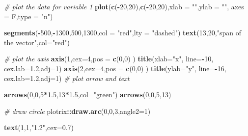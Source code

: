\documentclass[
]{book}
\newenvironment{Shaded}{\begin{snugshade}}{\end{snugshade}}
\newcommand{\CommentTok}[1]{\textcolor[rgb]{0.56,0.35,0.01}{\textit{#1}}}
\newcommand{\DataTypeTok}[1]{\textcolor[rgb]{0.13,0.29,0.53}{#1}}
\newcommand{\DecValTok}[1]{\textcolor[rgb]{0.00,0.00,0.81}{#1}}
\newcommand{\FloatTok}[1]{\textcolor[rgb]{0.00,0.00,0.81}{#1}}
\newcommand{\KeywordTok}[1]{\textcolor[rgb]{0.13,0.29,0.53}{\textbf{#1}}}
\newcommand{\NormalTok}[1]{#1}
\newcommand{\OperatorTok}[1]{\textcolor[rgb]{0.81,0.36,0.00}{\textbf{#1}}}
\newcommand{\StringTok}[1]{\textcolor[rgb]{0.31,0.60,0.02}{#1}}
\theoremstyle{definition}
\theoremstyle{definition}
\theoremstyle{definition}
\theoremstyle{remark}
\begin{document}
\begin{Shaded}
\begin{Highlighting}[]
\CommentTok{# plot the data for variable 1}
\KeywordTok{plot}\NormalTok{(}\KeywordTok{c}\NormalTok{(}\OperatorTok{-}\DecValTok{20}\NormalTok{,}\DecValTok{20}\NormalTok{),}\KeywordTok{c}\NormalTok{(}\OperatorTok{-}\DecValTok{20}\NormalTok{,}\DecValTok{20}\NormalTok{),}\DataTypeTok{xlab =} \StringTok{""}\NormalTok{,}\DataTypeTok{ylab =} \StringTok{""}\NormalTok{,}
 \DataTypeTok{axes =}\NormalTok{ F,}\DataTypeTok{type =} \StringTok{"n"}\NormalTok{)}

\KeywordTok{segments}\NormalTok{(}\OperatorTok{-}\DecValTok{500}\NormalTok{,}\OperatorTok{-}\DecValTok{1300}\NormalTok{,}\DecValTok{500}\NormalTok{,}\DecValTok{1300}\NormalTok{,}\DataTypeTok{col =} \StringTok{"red"}\NormalTok{,}\DataTypeTok{lty =} \StringTok{"dashed"}\NormalTok{)}
\KeywordTok{text}\NormalTok{(}\DecValTok{13}\NormalTok{,}\DecValTok{20}\NormalTok{,}\StringTok{"span of the vector"}\NormalTok{,}\DataTypeTok{col=}\StringTok{"red"}\NormalTok{)}

\CommentTok{# plot the axis}
\KeywordTok{axis}\NormalTok{(}\DecValTok{1}\NormalTok{,}\DataTypeTok{cex=}\DecValTok{4}\NormalTok{,}\DataTypeTok{pos =} \KeywordTok{c}\NormalTok{(}\DecValTok{0}\NormalTok{,}\DecValTok{0}\NormalTok{) )}
\KeywordTok{title}\NormalTok{(}\DataTypeTok{xlab=}\StringTok{"x"}\NormalTok{, }\DataTypeTok{line=}\OperatorTok{-}\DecValTok{10}\NormalTok{, }\DataTypeTok{cex.lab=}\FloatTok{1.2}\NormalTok{,}\DataTypeTok{adj=}\DecValTok{1}\NormalTok{)}
\KeywordTok{axis}\NormalTok{(}\DecValTok{2}\NormalTok{,}\DataTypeTok{cex=}\DecValTok{4}\NormalTok{,}\DataTypeTok{pos =} \KeywordTok{c}\NormalTok{(}\DecValTok{0}\NormalTok{,}\DecValTok{0}\NormalTok{) )}
\KeywordTok{title}\NormalTok{(}\DataTypeTok{ylab=}\StringTok{"y"}\NormalTok{, }\DataTypeTok{line=}\OperatorTok{-}\DecValTok{16}\NormalTok{, }\DataTypeTok{cex.lab=}\FloatTok{1.2}\NormalTok{,}\DataTypeTok{adj=}\DecValTok{1}\NormalTok{)}
\CommentTok{# plot arrow and text}

\KeywordTok{arrows}\NormalTok{(}\DecValTok{0}\NormalTok{,}\DecValTok{0}\NormalTok{,}\DecValTok{5}\OperatorTok{*}\FloatTok{1.5}\NormalTok{,}\DecValTok{13}\OperatorTok{*}\FloatTok{1.5}\NormalTok{,}\DataTypeTok{col=}\StringTok{"green"}\NormalTok{)}
\KeywordTok{arrows}\NormalTok{(}\DecValTok{0}\NormalTok{,}\DecValTok{0}\NormalTok{,}\DecValTok{5}\NormalTok{,}\DecValTok{13}\NormalTok{)}

\CommentTok{# draw circle}
\NormalTok{plotrix}\OperatorTok{::}\KeywordTok{draw.arc}\NormalTok{(}\DecValTok{0}\NormalTok{,}\DecValTok{0}\NormalTok{,}\DecValTok{3}\NormalTok{,}\DataTypeTok{angle2=}\DecValTok{1}\NormalTok{)}

\KeywordTok{text}\NormalTok{(}\DecValTok{1}\NormalTok{,}\DecValTok{1}\NormalTok{,}\StringTok{"1.2"}\NormalTok{,}\DataTypeTok{cex=}\FloatTok{0.7}\NormalTok{)}
\end{Highlighting}
\end{Shaded}
\end{document}
